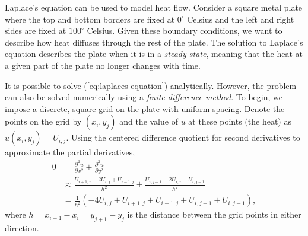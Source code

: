 Laplace's equation can be used to model heat flow.
Consider a square metal plate where the top and bottom borders are fixed at $0^\circ$ Celsius and the left and right sides are fixed at $100^\circ$ Celsius.
Given these boundary conditions, we want to describe how heat diffuses through the rest of the plate.
The solution to Laplace's equation describes the plate when it is in a \emph{steady state}, meaning that the heat at a given part of the plate no longer changes with time.

It is possible to solve (\ref{eq:laplaces-equation}) analytically.
However, the problem can also be solved numerically using a \emph{finite difference method}.
To begin, we impose a discrete, square grid on the plate with uniform spacing.
Denote the points on the grid by $(x_i,y_j)$ and the value of $u$ at these points (the heat) as $u(x_i,y_j) = U_{i,j}$.
Using the centered difference quotient for second derivatives to approximate the partial derivatives,
%
\begin{align}
\nonumber 0 &= \frac{\partial^2 u}{\partial x^2}+ \frac{\partial^2 u}{\partial y^2}\\
\nonumber &\approx \frac{U_{i+1,j}-2U_{i,j}+U_{i-1,j}}{h^2} + \frac{U_{i,j+1}-2U_{i,j}+U_{i,j-1}}{h^2}\\
&= \frac{1}{h^2}\left(-4U_{i,j} + U_{i+1,j} + U_{i-1,j} + U_{i,j+1} +  U_{i,j-1}\right),
\label{eq:laplace-finite-diff}
\end{align}
where $h = x_{i+1} - x_i = y_{j+1} - y_j$ is the distance between the grid points in either direction.
%

